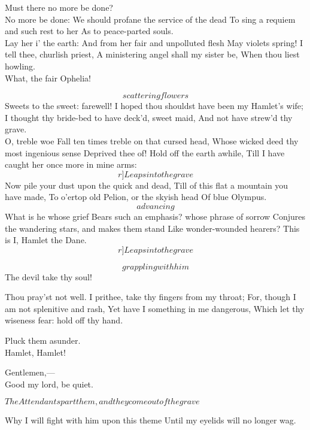 \documentclass[11pt]{book}
\begin{document}
\7	Must there no more be done? \\

	No more be done:
	We should profane the service of the dead
	To sing a requiem and such rest to her
	As to peace-parted souls.\\

\7	Lay her i' the earth:
	And from her fair and unpolluted flesh
	May violets spring! I tell thee, churlish priest,
	A ministering angel shall my sister be,
	When thou liest howling. \\

\1	What, the fair Ophelia!

\3	\[scattering flowers\] Sweets to the sweet: farewell!
	I hoped thou shouldst have been my Hamlet's wife;
	I thought thy bride-bed to have deck'd, sweet maid,
	And not have strew'd thy grave. \\

\7	O, treble woe
	Fall ten times treble on that cursed head,
	Whose wicked deed thy most ingenious sense
	Deprived thee of! Hold off the earth awhile,
	Till I have caught her once more in mine arms:
	\[r]Leaps into the grave\]
	Now pile your dust upon the quick and dead,
	Till of this flat a mountain you have made,
	To o'ertop old Pelion, or the skyish head
	Of blue Olympus. \\

\1	\[advancing\]     What is he whose grief
	Bears such an emphasis? whose phrase of sorrow
	Conjures the wandering stars, and makes them stand
	Like wonder-wounded hearers? This is I,
	Hamlet the Dane. \\	\[r]Leaps into the grave\]

\7	\[grappling with him\]  The devil take thy soul!

\1	Thou pray'st not well.
	I prithee, take thy fingers from my throat;
	For, though I am not splenitive and rash,
	Yet have I something in me dangerous,
	Which let thy wiseness fear: hold off thy hand.

\2	Pluck them asunder.\\

\3	Hamlet, Hamlet!

	Gentlemen,--- \\

\6	                  Good my lord, be quiet.

	\(The Attendants part them, and they come out of the grave\)

\1	Why I will fight with him upon this theme
	Until my eyelids will no longer wag.
\end{document}
